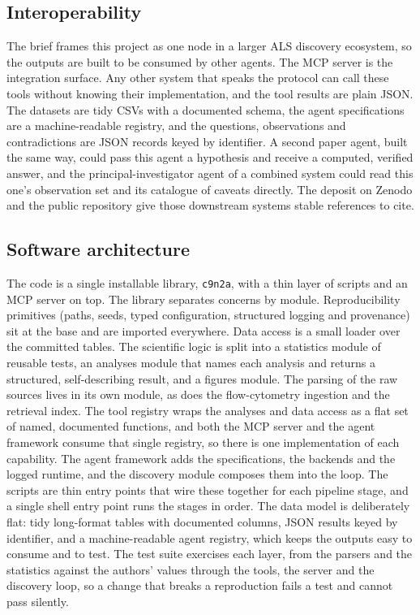 \documentclass[11pt]{article}
\begin{document}
\subsection{Interoperability}
The brief frames this project as one node in a larger ALS discovery ecosystem, so the outputs are
built to be consumed by other agents. The MCP server is the integration surface. Any other system
that speaks the protocol can call these tools without knowing their implementation, and the tool
results are plain JSON. The datasets are tidy CSVs with a documented schema, the agent
specifications are a machine-readable registry, and the questions, observations and contradictions
are JSON records keyed by identifier. A second paper agent, built the same way, could pass this
agent a hypothesis and receive a computed, verified answer, and the principal-investigator agent of
a combined system could read this one's observation set and its catalogue of caveats directly. The
deposit on Zenodo and the public repository give those downstream systems stable references to cite.

\subsection{Software architecture}
The code is a single installable library, \texttt{c9n2a}, with a thin layer of scripts and an MCP
server on top. The library separates concerns by module. Reproducibility primitives (paths, seeds,
typed configuration, structured logging and provenance) sit at the base and are imported everywhere.
Data access is a small loader over the committed tables. The scientific logic is split into a
statistics module of reusable tests, an analyses module that names each analysis and returns a
structured, self-describing result, and a figures module. The parsing of the raw sources lives in its
own module, as does the flow-cytometry ingestion and the retrieval index. The tool registry wraps the
analyses and data access as a flat set of named, documented functions, and both the MCP server and the
agent framework consume that single registry, so there is one implementation of each capability. The
agent framework adds the specifications, the backends and the logged runtime, and the discovery module
composes them into the loop. The scripts are thin entry points that wire these together for each
pipeline stage, and a single shell entry point runs the stages in order. The data model is
deliberately flat: tidy long-format tables with documented columns, JSON results keyed by identifier,
and a machine-readable agent registry, which keeps the outputs easy to consume and to test. The test
suite exercises each layer, from the parsers and the statistics against the authors' values through
the tools, the server and the discovery loop, so a change that breaks a reproduction fails a test and cannot pass silently.
\end{document}
